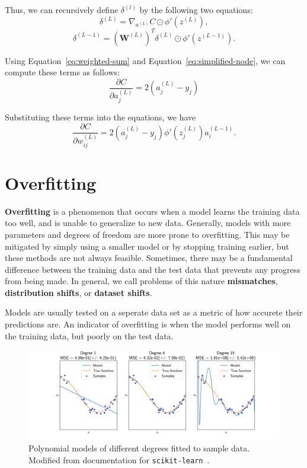 \documentclass[12pt]{report}
\theoremstyle{definition}
\theoremstyle{remark}
\begin{document}
Thus, we can recursively define $\delta^{(l)}$ by the following two equations:
\begin{equation}
    \delta^{(L)} = \nabla_{a^{(L)}}C \odot \phi'(z^{(L)}),
\end{equation}
\begin{equation}
    \delta^{(L-1)} = {\left(\mathbf{W}^{(L)}\right)}^T \delta^{(L)} \odot \phi'(z^{(L-1)}).
\end{equation}

Using Equation~\ref{eq:weighted-sum} and Equation~\ref{eq:simplified-node}, we can compute these terms as follows:
\begin{equation}
    \frac{\partial C}{\partial a_j^{(L)}} = 2(a_j^{(L)} - y_j)
\end{equation}

Substituting these terms into the equations, we have
\begin{equation}
    \frac{\partial C}{\partial w_{ij}^{(L)}} = 2(a_j^{(L)} - y_j) \phi'(z_j^{(L)}) a_i^{(L-1)}.
\end{equation}

\section{Overfitting}\label{sec:overfitting}
\textbf{Overfitting} is a phenomenon that occurs when a model learns the training data too well, and is unable to generalize to new data. Generally, models with more parameters and degrees of freedom are more prone to overfitting. This may be mitigated by simply using a smaller model or by stopping training earlier, but these methods are not always feasible. Sometimes, there may be a fundamental difference between the training data and the test data that prevents any progress from being made. In general, we call problems of this nature \textbf{mismatches}, \textbf{distribution shifts}, or \textbf{dataset shifts}.

Models are usually tested on a seperate data set as a metric of how accurete their predictions are. An indicator of overfitting is when the model performs well on the training data, but poorly on the test data.

\begin{figure}[h]
    \centering
    \includegraphics[width=\linewidth]{figs/underfitting_overfitting.png}
    \caption{Polynomial models of different degrees fitted to sample data. Modified from documentation for \texttt{scikit-learn}~\cite{pedregosa_scikit-learn_2011}.}
    \label{fig:overfitting}
\end{figure}
\end{document}

